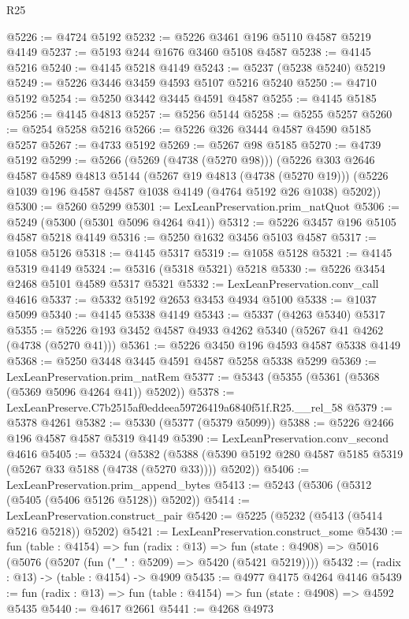 \begin{lexlean}{R25}
\begin{coremodule}
@5226 := @4724 @5192
@5232 := @5226 @3461 @196 @5110 @4587 @5219 @4149
@5237 := @5193 @244 @1676 @3460 @5108 @4587
@5238 := @4145 @5216
@5240 := @4145 @5218 @4149
@5243 := @5237 (@5238 @5240) @5219
@5249 := @5226 @3446 @3459 @4593 @5107 @5216 @5240
@5250 := @4710 @5192
@5254 := @5250 @3442 @3445 @4591 @4587
@5255 := @4145 @5185
@5256 := @4145 @4813
@5257 := @5256 @5144
@5258 := @5255 @5257
@5260 := @5254 @5258 @5216
@5266 := @5226 @326 @3444 @4587 @4590 @5185 @5257
@5267 := @4733 @5192
@5269 := @5267 @98 @5185
@5270 := @4739 @5192
@5299 := @5266
    (@5269 (@4738 (@5270 @98)))
    (@5226
      @303
      @2646
      @4587
      @4589
      @4813
      @5144
      (@5267 @19 @4813 (@4738 (@5270 @19)))
      (@5226 @1039 @196 @4587 @4587 @1038 @4149 (@4764 @5192 @26 @1038) @5202))
@5300 := @5260 @5299
@5301 := LexLeanPreservation.prim_natQuot
@5306 := @5249 (@5300 (@5301 @5096 @4264 @41))
@5312 := @5226 @3457 @196 @5105 @4587 @5218 @4149
@5316 := @5250 @1632 @3456 @5103 @4587
@5317 := @1058 @5126
@5318 := @4145 @5317
@5319 := @1058 @5128
@5321 := @4145 @5319 @4149
@5324 := @5316 (@5318 @5321) @5218
@5330 := @5226 @3454 @2468 @5101 @4589 @5317 @5321
@5332 := LexLeanPreservation.conv_call @4616
@5337 := @5332 @5192 @2653 @3453 @4934 @5100
@5338 := @1037 @5099
@5340 := @4145 @5338 @4149
@5343 := @5337 (@4263 @5340) @5317
@5355 := @5226 @193 @3452 @4587 @4933 @4262 @5340 (@5267 @41 @4262 (@4738 (@5270 @41)))
@5361 := @5226 @3450 @196 @4593 @4587 @5338 @4149
@5368 := @5250 @3448 @3445 @4591 @4587 @5258 @5338 @5299
@5369 := LexLeanPreservation.prim_natRem
@5377 := @5343 (@5355 (@5361 (@5368 (@5369 @5096 @4264 @41)) @5202))
@5378 := LexLeanPreserve.C7b2515af0eddeea59726419a6840f51f.R25.__rel_58
@5379 := @5378 @4261
@5382 := @5330 (@5377 (@5379 @5099))
@5388 := @5226 @2466 @196 @4587 @4587 @5319 @4149
@5390 := LexLeanPreservation.conv_second @4616
@5405 := @5324
    (@5382 (@5388 (@5390 @5192 @280 @4587 @5185 @5319 (@5267 @33 @5188 (@4738 (@5270 @33)))) @5202))
@5406 := LexLeanPreservation.prim_append_bytes
@5413 := @5243 (@5306 (@5312 (@5405 (@5406 @5126 @5128)) @5202))
@5414 := LexLeanPreservation.construct_pair
@5420 := @5225 (@5232 (@5413 (@5414 @5216 @5218)) @5202)
@5421 := LexLeanPreservation.construct_some
@5430 := fun (table : @4154) =>
  fun (radix : @13) =>
  fun (state : @4908) => @5016 (@5076 (@5207 (fun ("_" : @5209) => @5420 (@5421 @5219))))
@5432 := (radix : @13) -> (table : @4154) -> @4909
@5435 := @4977 @4175 @4264 @4146
@5439 := fun (radix : @13) => fun (table : @4154) => fun (state : @4908) => @4592 @5435
@5440 := @4617 @2661
@5441 := @4268 @4973

\end{coremodule}
\end{lexlean}
